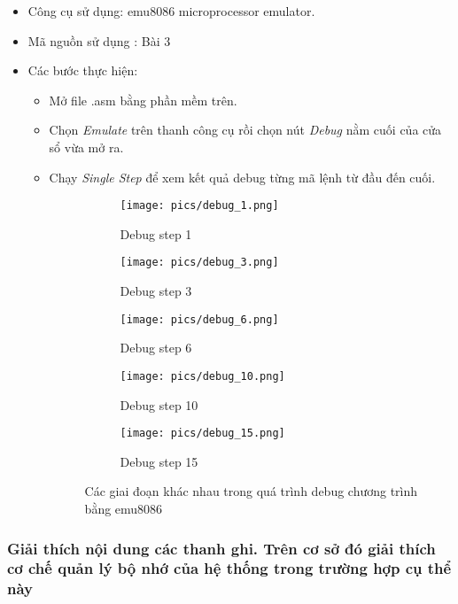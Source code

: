 \documentclass[12pt]{article}
\begin{document}
\begin{itemize}
  \item Công cụ sử dụng: emu8086 microprocessor emulator.
  \item Mã nguồn sử dụng : Bài 3 
  \item Các bước thực hiện:
  \begin{itemize}
    \item Mở file .asm bằng phần mềm trên.
    \item Chọn \textit{Emulate} trên thanh công cụ rồi chọn nút \textit{Debug} nằm cuối của cửa sổ vừa mở ra.
    \item Chạy \textit{Single Step} để xem kết quả debug từng mã lệnh từ đầu đến cuối.
 \begin{figure}[H]
  \centering
  \begin{subfigure}[b]{0.45\linewidth}
    \texttt{[image: pics/debug\_1.png]}
    \caption{Debug step 1}
  \end{subfigure}
  \hfill
  \begin{subfigure}[b]{0.45\linewidth}
    \texttt{[image: pics/debug\_3.png]}
    \caption{Debug step 3}
  \end{subfigure}
  
  \vspace{0.5em}
  \begin{subfigure}[b]{0.45\linewidth}
    \texttt{[image: pics/debug\_6.png]}
    \caption{Debug step 6}
  \end{subfigure}
  \hfill
  \begin{subfigure}[b]{0.45\linewidth}
    \texttt{[image: pics/debug\_10.png]}
    \caption{Debug step 10}
  \end{subfigure}

  \vspace{0.5em}
  \begin{subfigure}[b]{0.45\linewidth}
    \texttt{[image: pics/debug\_15.png]}
    \caption{Debug step 15}
  \end{subfigure}
  
  \caption{Các giai đoạn khác nhau trong quá trình debug chương trình bằng emu8086}
  \label{fig:debug_steps}
\end{figure}

  \end{itemize}
\end{itemize}

\subsubsection{Giải thích nội dung các thanh ghi. Trên cơ sở đó giải thích cơ chế quản lý bộ nhớ của hệ thống trong trường hợp cụ thể này}
\end{document}
